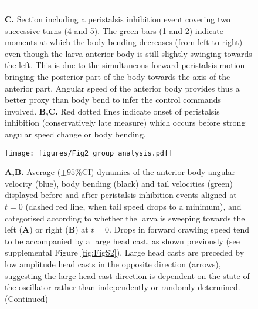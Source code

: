 \documentclass[11pt,a4paper]{article}
\newcommand{\todoBW}[1]{\todo[author=BW,color=orange, size=\tiny,inline]{#1}}
\begin{document}
\begin{figure}
\ContinuedFloat
\caption{
{\bf C.} Section including a peristalsis inhibition event covering two successive turns (4 and 5). The green bars (1 and 2) indicate moments at which the body bending decreases (from left to right) even though the larva anterior body is still slightly swinging towards the left. This is due to the simultaneous forward peristalsis motion bringing the posterior part of the body towards the axis of the anterior part. Angular speed of the anterior body provides thus a better proxy than body bend to infer the control commands involved.
 {\bf B,C.} Red dotted lines indicate onset of peristalsis inhibition (conservatively late measure) which occurs before strong angular speed change or body bending. 
}
\hrule
\end{figure}


\begin{figure}
\begin{center}
\texttt{[image: figures/Fig2\_group\_analysis.pdf]}
\caption{
{\bf A,B.} Average ($\pm 95\%$CI) dynamics of the anterior body angular velocity (blue), body bending (black) and tail velocities (green) displayed before and after peristalsis inhibition events aligned at $t=0$ (dashed red line, when tail speed drops to a minimum), and categorised according to whether the larva is sweeping towards the left ({\bf A}) or right ({\bf B}) at $t=0$. Drops in forward crawling speed tend to be accompanied by a large head cast, as shown previously \citep{hernandez2015reverse} (see supplemental Figure \ref{fig:FigS2}). Large head casts are preceded by low amplitude head casts in the opposite direction (arrows), suggesting the large head cast direction is dependent on the state of the oscillator rather than independently or randomly determined. (Continued)
}
\end{center}
\end{figure}
\end{document}
